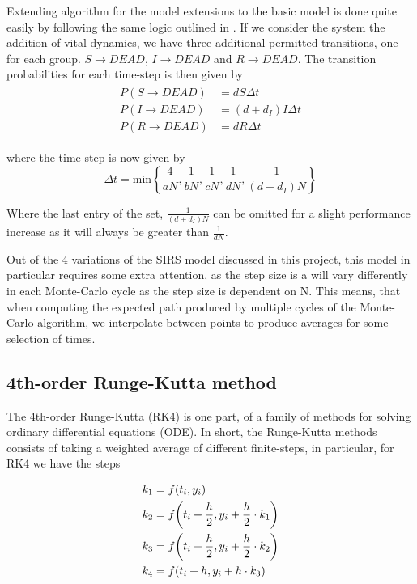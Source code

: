 \documentclass[10pt,showpacs,preprintnumbers,amsmath,amssymb,nofootinbib,aps,prl,twocolumn,groupedaddress,superscriptaddress,showkeys]{revtex4-1}
\begin{document}
  Extending algorithm for the model extensions to the basic model is done quite easily by following the same logic outlined in \textcite{project5}. If we consider the system the addition of vital dynamics, we have three additional permitted transitions, one for each group. $S\rightarrow DEAD$, $I\rightarrow DEAD$ and $R \rightarrow DEAD$. The transition probabilities for each time-step is then given by
  \begin{align}
    \begin{split}
      P(S\rightarrow DEAD) &= dS \Delta t \\
      P(I\rightarrow DEAD) &= (d + d_I)I\Delta t \\ 
      P(R\rightarrow DEAD) &= dR\Delta t
    \end{split}
  \end{align}

  where the time step is now given by
  \begin{equation}
      \Delta t = \text{min}\left\{ \frac{4}{aN}, \frac{1}{bN}, \frac{1}{cN}, \frac{1}{dN}, \frac{1}{(d + d_I)N} \right\}
  \end{equation}

  Where the last entry of the set, $\frac{1}{(d+d_I)N}$ can be omitted for a slight performance increase as it will always be greater than $\frac{1}{dN}$.

  Out of the 4 variations of the SIRS model discussed in this project, this model in particular requires some extra attention, as the step size is a will vary differently in each Monte-Carlo cycle as the step size is dependent on N. This means, that when computing the expected path produced by multiple cycles of the Monte-Carlo algorithm, we interpolate between points to produce averages for some selection of times.


  \subsection{4th-order Runge-Kutta method}
    The 4th-order Runge-Kutta (RK4) is one part, of a family of methods for solving ordinary differential equations (ODE). In short, the Runge-Kutta methods consists of taking a weighted average of different finite-steps, in particular, for RK4 we have the steps

    \begin{align}
      \begin{split}
        \centering           
        k_1 &= f(t_i, y_i) \\
        k_2 &= f \qty(t_i + \frac{h}{2}, y_i + \frac{h}{2} \cdot k_1) \\
        k_3 &= f \qty(t_i + \frac{h}{2}, y_i + \frac{h}{2} \cdot k_2) \\
        k_4 &= f \qty(t_i + h, y_i + h\cdot k_3)
      \end{split}         
    \end{align}
\end{document}
